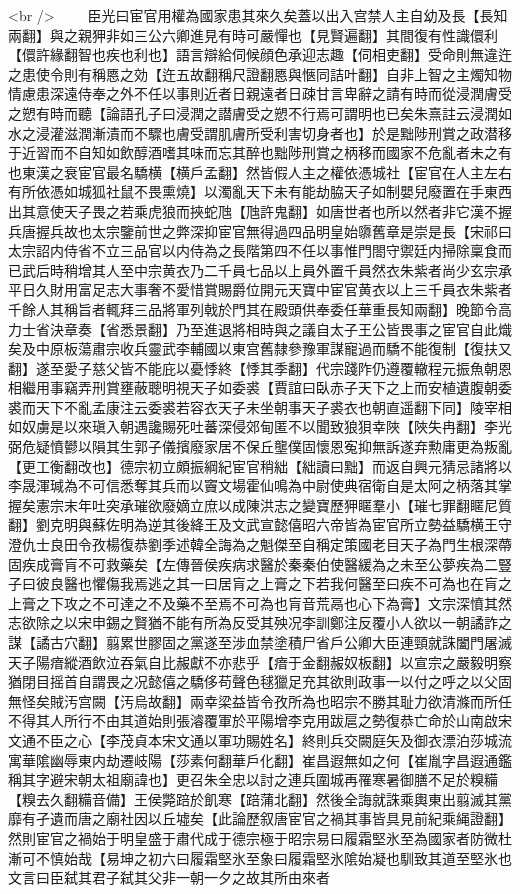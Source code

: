 <br />
　　臣光曰宦官用權為國家患其來久矣蓋以出入宫禁人主自幼及長【長知兩翻】與之親狎非如三公六卿進見有時可嚴憚也【見賢遍翻】其間復有性識儇利【儇許緣翻智也疾也利也】語言辯給伺候顔色承迎志趣【伺相吏翻】受命則無違迕之患使令則有稱㥦之効【迕五故翻稱尺證翻㥦與愜同詰叶翻】自非上智之主燭知物情慮患深遠侍奉之外不任以事則近者日親遠者日疎甘言卑辭之請有時而從浸潤膚受之愬有時而聽【論語孔子曰浸潤之譛膚受之愬不行焉可謂明也已矣朱熹註云浸潤如水之浸灌滋潤漸漬而不驟也膚受謂肌膚所受利害切身者也】於是黜陟刑賞之政潜移于近習而不自知如飲醇酒嗜其味而忘其醉也黜陟刑賞之柄移而國家不危亂者未之有也東漢之衰宦官最名驕横【横戶孟翻】然皆假人主之權依憑城社【宦官在人主左右有所依憑如城狐社鼠不畏熏燒】以濁亂天下未有能劫脇天子如制嬰兒廢置在手東西出其意使天子畏之若乘虎狼而挾蛇虺【虺許鬼翻】如唐世者也所以然者非它漢不握兵唐握兵故也太宗鑒前世之弊深抑宦官無得過四品明皇始隳舊章是崇是長【宋祁曰太宗詔内侍省不立三品官以内侍為之長階第四不任以事惟門閤守禦廷内掃除稟食而已武后時稍增其人至中宗黄衣乃二千員七品以上員外置千員然衣朱紫者尚少玄宗承平日久財用富足志大事奢不愛惜賞賜爵位開元天寶中宦官黄衣以上三千員衣朱紫者千餘人其稱旨者輒拜三品將軍列戟於門其在殿頭供奉委任華重長知兩翻】晚節令高力士省決章奏【省悉景翻】乃至進退將相時與之議自太子王公皆畏事之宦官自此熾矣及中原板蕩肅宗收兵靈武李輔國以東宫舊隸參豫軍謀寵過而驕不能復制【復扶又翻】遂至愛子慈父皆不能庇以憂悸終【悸其季翻】代宗踐阼仍遵覆轍程元振魚朝恩相繼用事竊弄刑賞壅蔽聰明視天子如委裘【賈誼曰臥赤子天下之上而安植遺腹朝委裘而天下不亂孟康注云委裘若容衣天子未坐朝事天子裘衣也朝直遥翻下同】陵宰相如奴虜是以來瑱入朝遇讒賜死吐蕃深侵郊甸匿不以聞致狼狽幸陜【陜失冉翻】李光弼危疑憤鬰以隕其生郭子儀擯廢家居不保丘壟僕固懷恩寃抑無訴遂弃勲庸更為叛亂【更工衡翻改也】德宗初立頗振綱紀宦官稍絀【絀讀曰黜】而返自興元猜忌諸將以李晟渾瑊為不可信悉奪其兵而以竇文場霍仙鳴為中尉使典宿衛自是太阿之柄落其掌握矣憲宗末年吐突承璀欲廢嫡立庶以成陳洪志之變寶歷狎䁥羣小【璀七罪翻䁥尼質翻】劉克明與蘇佐明為逆其後絳王及文武宣懿僖昭六帝皆為宦官所立勢益驕横王守澄仇士良田令孜楊復恭劉季述韓全誨為之魁傑至自稱定策國老目天子為門生根深蔕固疾成膏肓不可救藥矣【左傳晉侯疾病求醫於秦秦伯使醫緩為之未至公夢疾為二豎子曰彼良醫也懼傷我焉逃之其一曰居肓之上膏之下若我何醫至曰疾不可為也在肓之上膏之下攻之不可達之不及藥不至焉不可為也肓音荒鬲也心下為膏】文宗深憤其然志欲除之以宋申錫之賢猶不能有所為反受其殃况李訓鄭注反覆小人欲以一朝譎詐之謀【譎古穴翻】翦累世膠固之黨遂至涉血禁塗積尸省戶公卿大臣連頸就誅闔門屠滅天子陽瘖縱酒飲泣吞氣自比赧獻不亦悲乎【瘖于金翻赧奴板翻】以宣宗之嚴毅明察猶閉目摇首自謂畏之况懿僖之驕侈苟聲色毬獵足充其欲則政事一以付之呼之以父固無怪矣賊汚宫闕【汚烏故翻】兩幸梁益皆令孜所為也昭宗不勝其耻力欲清滌而所任不得其人所行不由其道始則張濬覆軍於平陽增李克用跋扈之勢復恭亡命於山南啟宋文通不臣之心【李茂貞本宋文通以軍功賜姓名】終則兵交闕庭矢及御衣漂泊莎城流寓華隂幽辱東内劫遷岐陽【莎素何翻華戶化翻】崔昌遐無如之何【崔胤字昌遐通鑑稱其字避宋朝太祖廟諱也】更召朱全忠以討之連兵圍城再罹寒暑御膳不足於糗糒【糗去久翻糒音備】王侯斃踣於飢寒【踣蒲北翻】然後全誨就誅乘輿東出翦滅其黨靡有孑遺而唐之廟社因以丘墟矣【此論歷叙唐宦官之禍其事皆具見前紀乘䋲證翻】然則宦官之禍始于明皇盛于肅代成于德宗極于昭宗易曰履霜堅氷至為國家者防微杜漸可不慎始哉【易坤之初六曰履霜堅氷至象曰履霜堅氷隂始凝也馴致其道至堅氷也文言曰臣弑其君子弑其父非一朝一夕之故其所由來者